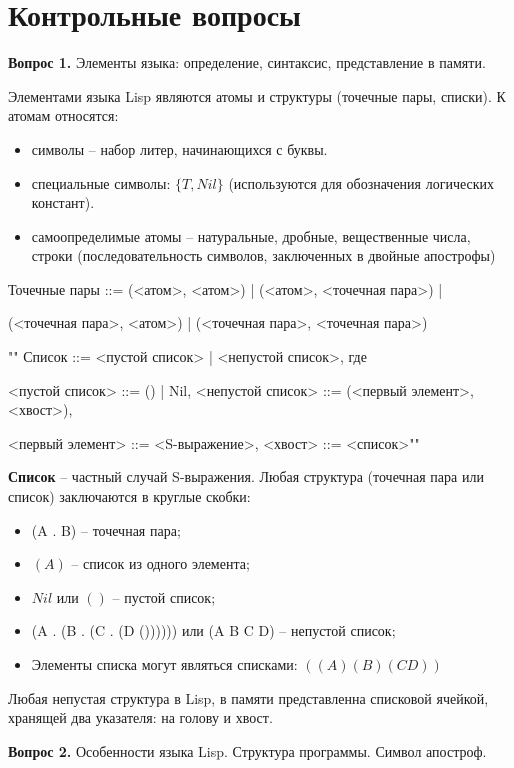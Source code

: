 \section*{Контрольные вопросы}
	\textbf{Вопрос 1.} Элементы языка: определение, синтаксис, представление в памяти.
	
	Элементами языка Lisp являются атомы и структуры (точечные пары, списки). К атомам относятся:
	\begin{itemize}
		\item символы -- набор литер, начинающихся с буквы.
		\item специальные символы: $\{T, Nil\}$ (используются для обозначения логических констант).
		\item самоопределимые атомы -- натуральные, дробные, вещественные числа, строки (последовательность символов, заключенных в двойные апострофы)
	\end{itemize}
	
		Точечные пары ::= (<атом>, <атом>) | (<атом>, <точечная пара>) |
	
	(<точечная пара>, <атом>) | (<точечная пара>, <точечная пара>)
	
	""\newline
	\indent Список ::= <пустой список> | <непустой список>, где
	
	<пустой список> ::= () | Nil, <непустой список> ::= (<первый элемент>, <хвост>),
	
	<первый элемент> ::= <S-выражение>, <хвост> ::= <список>""\newline
	
	\indent \textbf{Список} -- частный случай S-выражения. Любая структура (точечная пара или список) заключаются в круглые скобки:
	
\begin{itemize}
	\item (A . B) -- точечная пара;
	\item $(A)$ -- список из одного элемента;
	\item $Nil$ или $()$ -- пустой список;
	\item (A . (B . (C . (D ()))))) или (A B C D) -- непустой список;
	\item Элементы списка могут являться списками: $((A)(B)(CD))$
\end{itemize}
	
Любая непустая структура в Lisp, в памяти представленна списковой ячейкой, хранящей два указателя: на голову и хвост.

	
\textbf{Вопрос 2.} Особенности языка Lisp. Структура программы. Символ апостроф.

